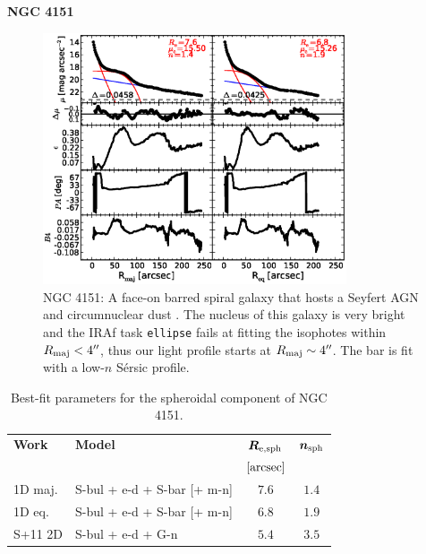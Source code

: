 \documentclass[preprint2]{emulateapj}
\newcommand{\fitfigurewidth}{0.8\textwidth}
\begin{document}
  \clearpage\newpage\noindent
  {\bf NGC 4151 \\}

  \begin{figure}[h]
  \begin{center}
  \includegraphics[width=\fitfigurewidth]{n4151_1Dfit.eps}
  \caption{NGC 4151:
  A face-on barred spiral galaxy that hosts a Seyfert AGN \citep{veroncettyveron2006} 
  and circumnuclear dust \citep{pott2010}.
  The nucleus of this galaxy is very bright and the IRAf task {\tt ellipse} fails at fitting the isophotes within $R_{\rm maj} < 4''$, 
  thus our light profile starts at $R_{\rm maj} \sim 4''$. 
  The bar is fit with a low-$n$ S\'ersic profile.  
  }
  \end{center}
  \end{figure}

  \begin{table}[h]
  \small
  \caption{Best-fit parameters for the spheroidal component of NGC 4151.}
  \begin{center}
  \begin{tabular}{llcc}
  \hline
  {\bf Work} & {\bf Model}   & $\bm R_{\rm e,sph}$    & $\bm n_{\rm sph}$ \\
    &  &  $[\rm arcsec]$ & \\
  \hline
  1D maj. & S-bul + e-d + S-bar [+ m-n] & $7.6$  &  $1.4$ \\
  1D eq.  & S-bul + e-d + S-bar [+ m-n] & $6.8$  &  $1.9$ \\
  \hline
  S+11 2D         & S-bul + e-d + G-n         & $5.4$  &  $3.5$ \\
  \hline
  \end{tabular}
  \end{center}
  \label{tab:n4151}
  \end{table}
\end{document}
